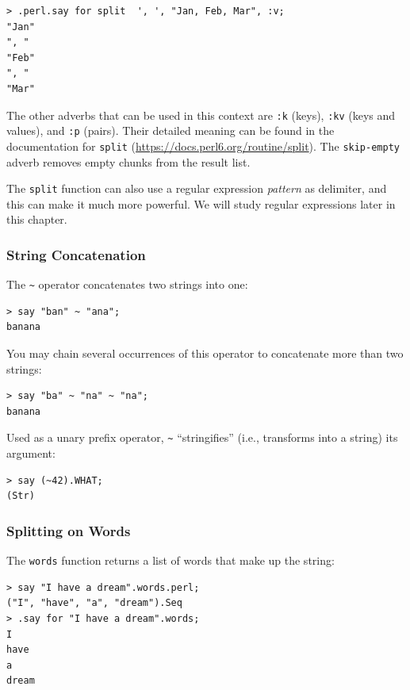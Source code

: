 \begin{verbatim}
> .perl.say for split  ', ', "Jan, Feb, Mar", :v;
"Jan"
", "
"Feb"
", "
"Mar"
\end{verbatim}

The other adverbs that can be used in this context are 
{\tt :k} (keys), {\tt :kv} (keys and values), and {\tt :p} 
(pairs). Their detailed meaning can be 
found in the documentation for {\tt split} 
(\url{https://docs.perl6.org/routine/split}). The 
{\tt skip-empty} adverb removes empty chunks from the result 
list.

The {\tt split} function can also use a regular expression 
\emph{pattern} as delimiter, and this can make it much more powerful. 
We will study regular expressions later in this chapter.

\subsubsection{String Concatenation}


The \verb'~' operator concatenates two strings into one:

\begin{verbatim}
> say "ban" ~ "ana";
banana
\end{verbatim}
%

You may chain several occurrences of this operator to 
concatenate more than two strings:

\begin{verbatim}
> say "ba" ~ "na" ~ "na";
banana
\end{verbatim}
%

Used as a unary prefix operator,
\verb'~' ``stringifies'' (i.e., transforms into a string) its argument:

\begin{verbatim}
> say (~42).WHAT;
(Str)
\end{verbatim}
%

\subsubsection{Splitting on Words}

The {\tt words} function returns a list of words that make 
up the string:

\begin{verbatim}
> say "I have a dream".words.perl;
("I", "have", "a", "dream").Seq
> .say for "I have a dream".words;
I
have
a
dream
\end{verbatim}
%

